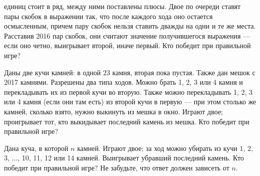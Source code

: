 ﻿
\begin{itemize}

 единиц стоит в ряд, между ними поставлены плюсы. Двое по очереди ставят пары скобок в выражении так, что после каждого хода оно остается осмысленным, причем пару скобок нельзя ставить дважды на одни и те же места. Расставив 2016 пар скобок, они считают значение получившегося выражения — если оно четно, выигрывает второй, иначе первый. Кто победит при правильной игре?

\itB Даны две кучи камней: в одной 23 камня, вторая пока пустая. Также дан мешок с 2017 камнями. Разрешены два типа ходов. Можно брать 1, 2, 3 или 4 камня и перекладывать их из первой кучи во вторую. Также можно перекладывать 1, 2, 3 или 4 камня (если они там есть) из второй кучи в первую — при этом столько же камней, сколько взято, нужно выкинуть из мешка в окно. Играют двое; проигрывает тот, кто выкидывает последний камень из мешка. Кто победит при правильной игре?

\itC Дана куча, в которой $n$ камней. Играют двое; за ход можно убирать из кучи 1, 2, 3, ..., 10, 11, 12 или 14 камней. Выигрывает убравший последний камень. Кто победит при правильной игре? Не забудьте, что ответ должен зависеть от $n$.
\end{itemize}